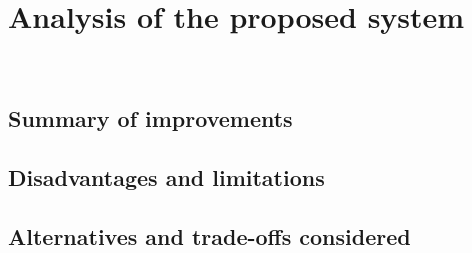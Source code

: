 \chapter{Analysis of the proposed system \\
\label{Chapter::Analysis of the proposed system}}\


\section{Summary of improvements \label{Section::Summary of Imporvements }}


\section{Disadvantages and limitations \label{Section::Disadvantages and Limitations}}




\section{Alternatives and trade-offs considered \label{Section::Alternatives and trade-offs considered}}



